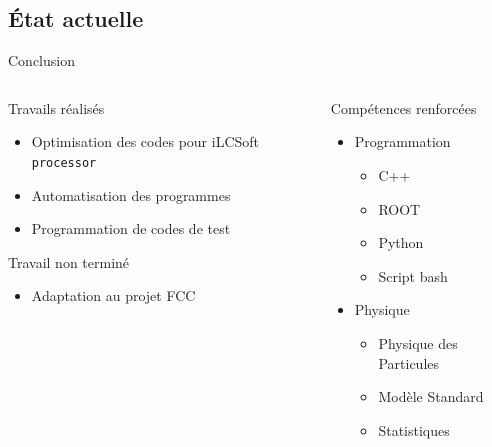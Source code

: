 \documentclass[9pt]{beamer}
\begin{document}

\subsection{État actuelle}
\begin{frame}{Conclusion}

\begin{columns}

	\begin{column}{0.45\textwidth}
		\begin{exampleblock}{Travails réalisés}
			\begin{itemize}
		 		\item Optimisation des codes pour iLCSoft \texttt{processor}
		 		\item Automatisation des programmes
		 		\item Programmation de codes de test
			\end{itemize}
		\end{exampleblock}
        \begin{alertblock}{Travail non terminé}
			\begin{itemize}
		 		\item Adaptation au projet FCC
			\end{itemize}
		\end{alertblock}
	\end{column}
	
	\begin{column}{0.45\textwidth}
		\begin{block}{Compétences renforcées}
			\begin{itemize}
                \item Programmation
                \begin{itemize}
                    \item C++
                    \item ROOT
                    \item Python
                    \item Script bash
                \end{itemize}
                
                \item Physique
                \begin{itemize}
                    \item Physique des Particules
                    \item Modèle Standard
                    \item Statistiques
                \end{itemize}
            

\end{itemize}
\end{block}
\end{column}
\end{columns}
\end{frame}
\end{document}
